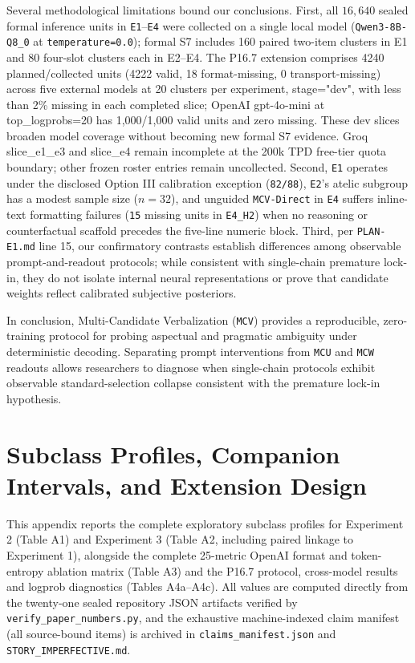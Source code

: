 \documentclass[11pt,a4paper]{article}
\begin{document}
Several methodological limitations bound our conclusions. First, all $16{,}640$ sealed formal inference units in \texttt{E1}--\texttt{E4} were collected on a single local model (\texttt{Qwen3-\allowbreak{}8B-\allowbreak{}Q8\_\allowbreak{}0} at \texttt{temperature=\allowbreak{}0.0}); formal S7 includes 160 paired two-item clusters in E1 and 80 four-slot clusters each in E2--E4. The P16.7 extension comprises 4240 planned/collected units (4222 valid, 18 format-missing, 0 transport-missing) across five external models at 20 clusters per experiment, stage="dev", with less than 2\% missing in each completed slice; OpenAI gpt-4o-mini at top\_\allowbreak{}logprobs=20 has 1,000/1,000 valid units and zero missing. These dev slices broaden model coverage without becoming new formal S7 evidence. Groq slice\_\allowbreak{}e1\_\allowbreak{}e3 and slice\_\allowbreak{}e4 remain incomplete at the 200k TPD free-tier quota boundary; other frozen roster entries remain uncollected. Second, \texttt{E1} operates under the disclosed Option III calibration exception (\texttt{82/\allowbreak{}88}), \texttt{E2}'s atelic subgroup has a modest sample size ($n=32$), and unguided \texttt{MCV-\allowbreak{}Direct} in \texttt{E4} suffers inline-text formatting failures (\texttt{15} missing units in \texttt{E4\_\allowbreak{}H2}) when no reasoning or counterfactual scaffold precedes the five-line numeric block. Third, per \texttt{PLAN-\allowbreak{}E1.md} line 15, our confirmatory contrasts establish differences among observable prompt-and-readout protocols; while consistent with single-chain premature lock-in, they do not isolate internal neural representations or prove that candidate weights reflect calibrated subjective posteriors.

In conclusion, Multi-Candidate Verbalization (\texttt{MCV}) provides a reproducible, zero-training protocol for probing aspectual and pragmatic ambiguity under deterministic decoding. Separating prompt interventions from \texttt{MCU} and \texttt{MCW} readouts allows researchers to diagnose when single-chain protocols exhibit observable standard-selection collapse consistent with the premature lock-in hypothesis.

\appendix
\section{Subclass Profiles, Companion Intervals, and Extension Design}

This appendix reports the complete exploratory subclass profiles for Experiment 2 (Table A1) and Experiment 3 (Table A2, including paired linkage to Experiment 1), alongside the complete 25-metric OpenAI format and token-entropy ablation matrix (Table A3) and the P16.7 protocol, cross-model results and logprob diagnostics (Tables A4a--A4c). All values are computed directly from the twenty-one sealed repository JSON artifacts verified by \texttt{verify\_\allowbreak{}paper\_\allowbreak{}numbers.py}, and the exhaustive machine-indexed claim manifest (all source-bound items) is archived in \texttt{claims\_\allowbreak{}manifest.json} and \texttt{STORY\_\allowbreak{}IMPERFECTIVE.md}.
\end{document}
